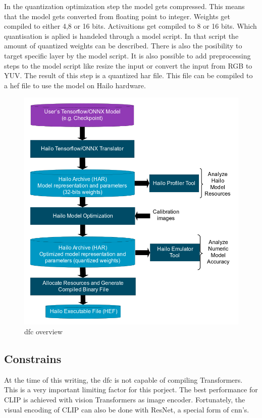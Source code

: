 In the quantization optimization step the model gets compressed.
This means that the model gets converted from floating point to integer.
Weights get compiled to either 4,8 or 16 bits.
Activaitions get compiled to 8 or 16 bits.
Which quantisation is aplied is handeled through a model script.
In that script the amount of quantized weights can be described.
There is also the posibility to target specific layer by the model script.
It is also possible to add preprocessing steps to the model script like resize the input or convert the input from RGB to YUV.
The result of this step is a quantized \acrshort{har} file.
This file can be compiled to a \acrshort{hef} file to use the model on Hailo hardware.

\begin{figure}[!h]
    \centering
    \includegraphics[width=\textwidth]{Images/Hardware/model_build_overview_with_onnx_and_hef_w_har.png}
    \caption{\Acrlong{dfc} overview \cite{hailo_dataflow_compiler}}
    \label{fig:hardware:dfcoverview}
\end{figure}

\subsection{Constrains}
At the time of this writing, the \acrshort{dfc} is not capable of compiling Transformers.
This is a very important limiting factor for this porject.
The best performance for CLIP is achieved with vision Transformers as image encoder.
Fortunately, the visual encoding of CLIP can also be done with ResNet, a special form of \Acrshort{cnn}'s.

